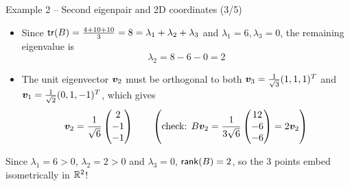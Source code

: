 \documentclass[aspectratio=169]{beamer}\usepackage[]{graphicx}\usepackage[]{xcolor}
\begin{document}
\begin{frame}{Example 2 -- Second eigenpair and 2D coordinates (3/5)}
\begin{itemize}
\item Since $\mathsf{tr}(B) = \frac{4 + 10 + 10}{3} = 8 = \lambda_1 + \lambda_2 + \lambda_3$ and $\lambda_1 = 6, \lambda_3 = 0$, the remaining eigenvalue is
\[
\lambda_2 = 8 - 6 - 0 = 2
\]
\item The unit eigenvector $\bm{v}_2$ must be orthogonal to both $\bm{v}_3 = \frac{1}{\sqrt{3}}(1,1,1)^T$ and $\bm{v}_1 = \frac{1}{\sqrt{2}}(0,1,-1)^T$, which gives
\[
\bm{v}_2 = \frac{1}{\sqrt{6}}\begin{pmatrix} 2 \\ -1 \\ -1 \end{pmatrix}
\qquad\left(\text{check: } B\bm{v}_2 = \frac{1}{3\sqrt{6}}\begin{pmatrix} 12 \\ -6 \\ -6 \end{pmatrix} = 2\bm{v}_2\right)
\]
\end{itemize}
\vfill
Since $\lambda_1 = 6 > 0$, $\lambda_2 = 2 > 0$ and $\lambda_3 = 0$, $\mathsf{rank}(B) = 2$, so the $3$ points embed isometrically in $\mathbb{R}^2$!
\end{frame}
\end{document}
